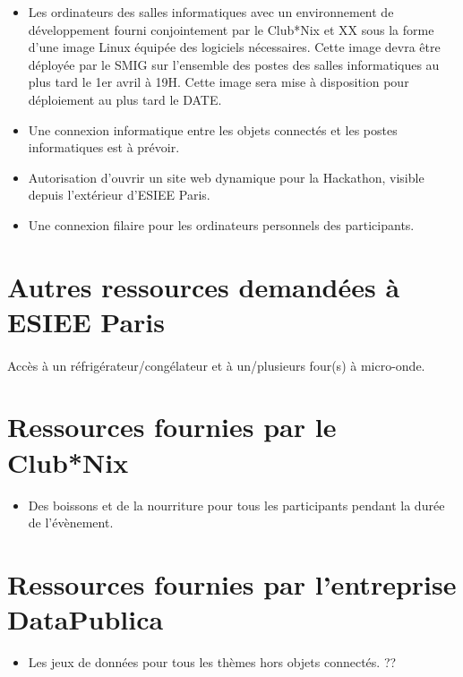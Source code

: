 \documentclass{article}
\begin{document}
\begin{itemize}
	\item Les ordinateurs des salles informatiques avec un environnement de
		développement fourni conjointement par le Club*Nix et XX sous la forme
		d'une image Linux équipée des logiciels nécessaires. Cette image devra
		être déployée par le SMIG sur l'ensemble des postes des salles
		informatiques au plus tard le 1er avril à 19H. Cette image sera mise à
		disposition pour déploiement au plus tard le DATE.
	\item Une connexion informatique entre les objets connectés et les postes
		informatiques est à prévoir.
	\item Autorisation d'ouvrir un site web dynamique pour la Hackathon,
		visible depuis l'extérieur d'ESIEE Paris.
	\item Une connexion filaire pour les ordinateurs personnels des
		participants.
\end{itemize}

\section{Autres ressources demandées à ESIEE Paris}

\paragraph{}
Accès à un réfrigérateur/congélateur et à un/plusieurs four(s) à micro-onde.

\section{Ressources fournies par le Club*Nix}

\begin{itemize}
	\item Des boissons et de la nourriture pour tous les participants pendant
		la durée de l'évènement.
\end{itemize}

\section{Ressources fournies par l'entreprise DataPublica }

\begin{itemize}
	\item Les jeux de données pour tous les thèmes hors objets connectés. ??
\end{itemize}
\end{document}
